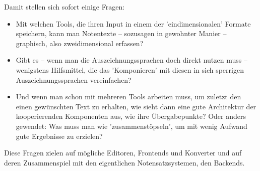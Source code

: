 Damit stellen sich sofort einige Fragen:

\begin{itemize}
  \item Mit welchen Tools, die ihren Input in einem der 'eindimensionalen'
  Formate speichern, kann man Notentexte -- sozusagen in gewohnter Manier
  -- graphisch, also zweidimensional erfassen?
  \item Gibt es -- wenn man die Auszeichnungssprachen doch direkt nutzen muss --
  wenigstens Hilfsmittel, die das 'Komponieren' mit diesen in sich sperrigen
  Auszeichnungssprachen vereinfachen?
  \item Und wenn man schon mit mehreren Tools arbeiten muss, um zuletzt den
  einen gewünschten Text zu erhalten, wie sieht dann eine gute Architektur der
  kooperierenden Komponenten aus, wie ihre Übergabepunkte? Oder anders gewendet:
  Was muss man wie 'zusammenstöpseln', um mit wenig Aufwand gute Ergebnisse zu
  erzielen?
\end{itemize}

Diese Fragen zielen auf mögliche Editoren, Frontends und Konverter und auf
deren Zusammenspiel mit den eigentlichen Notensatzsystemen, den Backends. 


